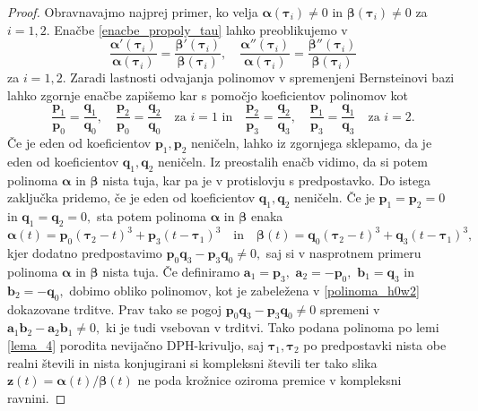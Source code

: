 \documentclass[12pt,a4paper,twoside]{article}
\theoremstyle{definition} %
\theoremstyle{plain} %
\theoremstyle{primerstyle}
\numberwithin{equation}{section}  %
\newcommand{\aV}{\mathbf{a}}
\newcommand{\bV}{\mathbf{b}}
\newcommand{\pV}{\mathbf{p}}
\newcommand{\qV}{\mathbf{q}}
\newcommand{\zV}{\mathbf{z}}
\newcommand{\balpha}{\boldsymbol \alpha}
\newcommand{\bbeta}{\boldsymbol \beta}
\newcommand{\btau}{\boldsymbol \tau}
\begin{document}
\begin{proof}
	Obravnavajmo najprej primer, ko velja $\balpha(\btau_i)\neq0$ in $\bbeta(\btau_i)\neq0$ za $i=1,2.$ Enačbe \eqref{enacbe_propoly_tau} lahko preoblikujemo v
	\begin{equation*}
		\frac{\balpha'(\btau_i)}{\balpha(\btau_i)}=\frac{\bbeta'(\btau_i)}{\bbeta(\btau_i)},\quad\frac{\balpha''(\btau_i)}{\balpha(\btau_i)}=\frac{\bbeta''(\btau_i)}{\bbeta(\btau_i)}
	\end{equation*}
	za $i=1,2.$ Zaradi lastnosti odvajanja polinomov v spremenjeni Bernsteinovi bazi lahko zgornje enačbe zapišemo kar s pomočjo koeficientov polinomov kot
	\begin{equation*}
		\frac{\pV_1}{\pV_0}=\frac{\qV_1}{\qV_0},\quad\frac{\pV_2}{\pV_0}=\frac{\qV_2}{\qV_0}\quad\text{za }i=1\text{  in}\quad\frac{\pV_2}{\pV_3}=\frac{\qV_2}{\qV_3},\quad\frac{\pV_1}{\pV_3}=\frac{\qV_1}{\qV_3}\quad\text{za }i=2.
	\end{equation*}
	Če je eden od koeficientov $\pV_1,\pV_2$ neničeln, lahko iz zgornjega sklepamo, da je eden od koeficientov $\qV_1,\qV_2$ neničeln. Iz preostalih enačb vidimo, da si potem polinoma $\balpha$ in $\bbeta$ nista tuja, kar pa je v protislovju s predpostavko. Do istega zaključka pridemo, če je eden od koeficientov $\qV_1,\qV_2$ neničeln. Če je $\pV_1=\pV_2=0$ in $\qV_1=\qV_2=0,$ sta potem polinoma $\balpha$ in $\bbeta$ enaka
	\begin{equation*}
		\balpha(t)=\pV_0(\btau_2-t)^3+\pV_3(t-\btau_1)^3\quad\text{in}\quad\bbeta(t)=\qV_0(\btau_2-t)^3+\qV_3(t-\btau_1)^3,
	\end{equation*}
	kjer dodatno predpostavimo $\pV_0\qV_3-\pV_3\qV_0\neq0,$ saj si v nasprotnem primeru polinoma $\balpha$ in $\bbeta$ nista tuja. Če definiramo $\aV_1=\pV_3,$ $\aV_2=-\pV_0,$ $\bV_1=\qV_3$ in $\bV_2=-\qV_0,$ dobimo obliko polinomov, kot je zabeležena v \eqref{polinoma_h0w2} dokazovane trditve. Prav tako se pogoj $\pV_0\qV_3-\pV_3\qV_0\neq0$ spremeni v $\aV_1\bV_2-\aV_2\bV_1\neq0,$ ki je tudi vsebovan v trditvi. Tako podana polinoma po lemi \ref{lema_4} porodita nevijačno DPH-krivuljo, saj $\btau_1,\btau_2$ po predpostavki nista obe realni števili in nista konjugirani si kompleksni števili ter tako slika $\zV(t)=\balpha(t)/\bbeta(t)$ ne poda krožnice oziroma premice v kompleksni ravnini.
	

\end{proof}
\end{document}
